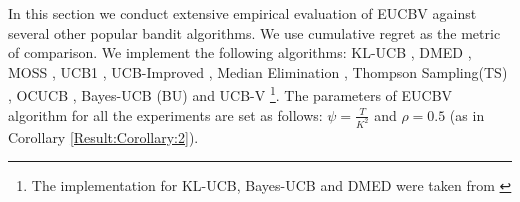 In this section we conduct extensive empirical evaluation of EUCBV against several other popular bandit algorithms.  We use cumulative regret as the metric of comparison. We implement the following algorithms:  KL-UCB \citep{garivier2011kl}, DMED \citep{honda2010asymptotically}, MOSS \citep{audibert2009minimax}, UCB1 \citep{auer2002finite}, UCB-Improved \citep{auer2010ucb}, Median Elimination \citep{even2006action}, Thompson Sampling(TS) \citep{agrawal2011analysis}, OCUCB \citep{lattimore2015optimally}, Bayes-UCB (BU) \citep{kaufmann2012bayesian} and UCB-V \citep{audibert2009exploration}\footnote{The implementation for KL-UCB, Bayes-UCB and DMED were taken from \citet{CapGarKau12}}. The parameters of EUCBV algorithm for all the experiments are set as follows: $\psi=\frac{T}{K^2}$ and $\rho =0.5$ (as in Corollary \ref{Result:Corollary:2}).

